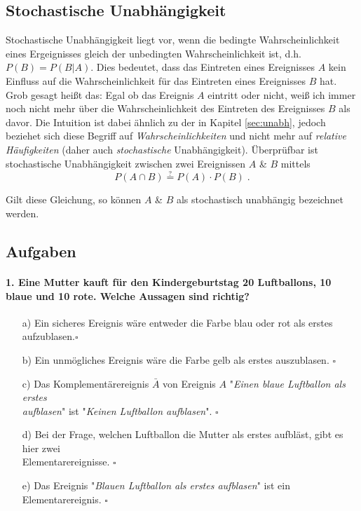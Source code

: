 \documentclass[a4paper]{article}
\begin{document}
\clearpage 

\subsection{Stochastische Unabhängigkeit}\label{sec:sto-unabh}
Stochastische Unabhängigkeit liegt vor, wenn die bedingte Wahrscheinlichkeit eines Ergeignisses gleich der unbedingten Wahrscheinlichkeit ist, d.h. $P(B) = P(B|A)$. Dies bedeutet, dass das Eintreten eines Ereignisses $A$ kein Einfluss auf die Wahrscheinlichkeit für das Eintreten eines Ereignisses $B$ hat. Grob gesagt heißt das: Egal ob das Ereignis $A$ eintritt oder nicht, weiß ich immer noch nicht mehr über die Wahrscheinlichkeit des Eintreten des Ereignisses $B$ als davor. Die Intuition ist dabei ähnlich zu der in Kapitel \ref{sec:unabh}, jedoch beziehet sich diese Begriff auf \textit{Wahrscheinlichkeiten} und nicht mehr auf \textit{relative Häufigkeiten} (daher auch \textit{stochastische} Unabhängigkeit).
Überprüfbar ist stochastische Unabhängigkeit zwischen zwei Ereignissen $A$ \& $B$ mittels
$$P(A \cap B) \stackrel{?}{=} P(A) \cdot P(B)\;.$$

\noindent Gilt diese Gleichung, so können $A$ \& $B$ als stochastisch unabhängig bezeichnet werden.

\clearpage

\subsection{Aufgaben}
\paragraph{1. Eine Mutter kauft für den Kindergeburtstag 20 Luftballons, 10 blaue und 10 rote. Welche Aussagen sind richtig?}
\begin{itemize}
    \item[a)] Ein sicheres Ereignis wäre entweder die Farbe blau oder rot als erstes aufzublasen.\hfill $\square$
    \item[b)] Ein unmögliches Ereignis wäre die Farbe gelb als erstes auszublasen. \hfill $\square$
    \item[c)] Das Komplementärereignis $\bar A$ von Ereignis $A$ "\textit{Einen blaue Luftballon als erstes \\aufblasen}" ist "\textit{Keinen Luftballon aufblasen}". \hfill  $\square$
    \item[d)] Bei der Frage, welchen Luftballon die Mutter als erstes aufbläst, gibt es hier zwei\\ Elementarereignisse. \hfill $\square$
    \item[e)] Das Ereignis "\textit{Blauen Luftballon als erstes aufblasen}" ist ein Elementarereignis. \hfill $\square$
\end{itemize}
\end{document}
